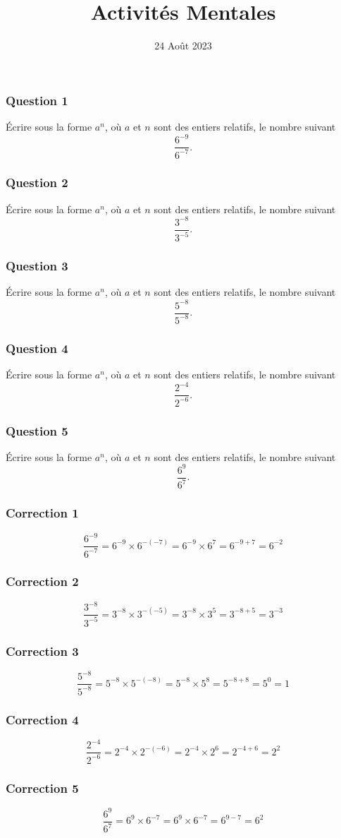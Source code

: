 \documentclass[15pt, mathserif]{beamer}
\title{Activités Mentales}
\date{24 Août 2023}
\begin{document}
\begin{frame}
    \titlepage
\end{frame}

\begin{frame} 
	\frametitle{Question 1}
	Écrire sous la forme $a^n$, où $a$ et $n$ sont des entiers relatifs, le nombre suivant \[\dfrac{6^{-9}}{6^{-7}}.\]
\end{frame}


\begin{frame} 
	\frametitle{Question 2}
	Écrire sous la forme $a^n$, où $a$ et $n$ sont des entiers relatifs, le nombre suivant \[\dfrac{3^{-8}}{3^{-5}}.\]
\end{frame}


\begin{frame} 
	\frametitle{Question 3}
	Écrire sous la forme $a^n$, où $a$ et $n$ sont des entiers relatifs, le nombre suivant \[\dfrac{5^{-8}}{5^{-8}}.\]
\end{frame}


\begin{frame} 
	\frametitle{Question 4}
	Écrire sous la forme $a^n$, où $a$ et $n$ sont des entiers relatifs, le nombre suivant \[\dfrac{2^{-4}}{2^{-6}}.\]
\end{frame}


\begin{frame} 
	\frametitle{Question 5}
	Écrire sous la forme $a^n$, où $a$ et $n$ sont des entiers relatifs, le nombre suivant \[\dfrac{6^{9}}{6^{7}}.\]
\end{frame}


\begin{frame}
\vspace{-10mm}
	\frametitle{Correction 1}
		\[\dfrac{6^{-9}}{6^{-7}} = 6^{-9} \times 6^{-\left(-7\right)} = 6^{-9} \times 6^{7} = 6^{-9+7} = 6^{-2}\]
\end{frame}


\begin{frame}
\vspace{-10mm}
	\frametitle{Correction 2}
		\[\dfrac{3^{-8}}{3^{-5}} = 3^{-8} \times 3^{-\left(-5\right)} = 3^{-8} \times 3^{5} = 3^{-8+5} = 3^{-3}\]
\end{frame}


\begin{frame}
\vspace{-10mm}
	\frametitle{Correction 3}
		\[\dfrac{5^{-8}}{5^{-8}} = 5^{-8} \times 5^{-\left(-8\right)} = 5^{-8} \times 5^{8} = 5^{-8+8} = 5^{0} = 1\]
\end{frame}


\begin{frame}
\vspace{-10mm}
	\frametitle{Correction 4}
		\[\dfrac{2^{-4}}{2^{-6}} = 2^{-4} \times 2^{-\left(-6\right)} = 2^{-4} \times 2^{6} = 2^{-4+6} = 2^{2}\]
\end{frame}


\begin{frame}
\vspace{-10mm}
	\frametitle{Correction 5}
		\[\dfrac{6^{9}}{6^{7}} = 6^{9} \times 6^{-7} = 6^{9} \times 6^{-7} = 6^{9-7} = 6^{2}\]
\end{frame}
\end{document}
